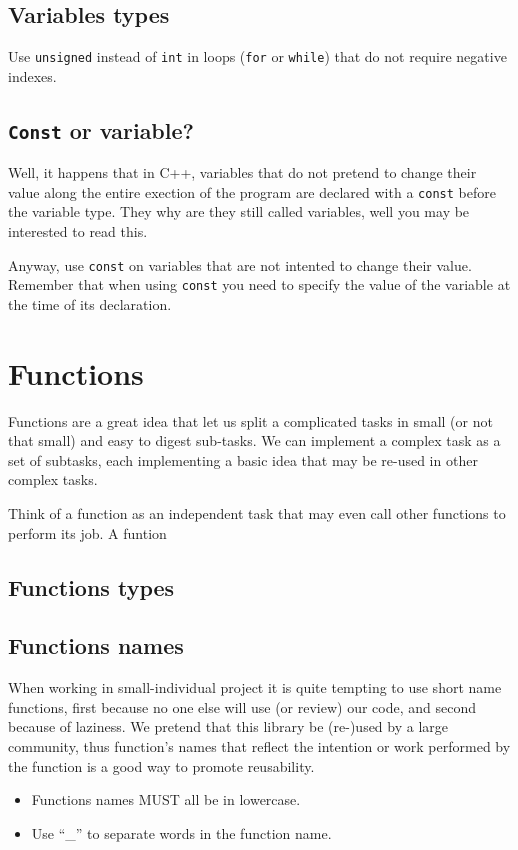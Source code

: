 \documentclass[12pt,a4paper,final]{report} %
\begin{document}
\subsection{Variables types}
Use \texttt{unsigned} instead of \texttt{int} in loops (\texttt{for}
or \texttt{while}) that do not require negative indexes.

\subsection{\texttt{Const} or variable?}
Well, it happens that in C++, variables that do not pretend to change
their value along the entire exection of the program are declared with
a \texttt{const} before the variable type. They why are they still
called variables, well you may be interested to read this.

Anyway, use \texttt{const} on variables that are not intented to
change their value. Remember that when using \texttt{const} you need
to specify the value of the variable at the time of its declaration.

\section{Functions}
Functions are a great idea that let us split a complicated tasks in
small (or not that small) and easy to digest sub-tasks. We can
implement a complex task as a set of subtasks, each implementing a
basic idea that may be re-used in other complex tasks.

Think of a function as an independent task that may even call other
functions to perform its job. A funtion

\subsection{Functions types}

\subsection{Functions names}
When working in small-individual project it is quite tempting to use
short name functions, first because no one else will use (or review)
our code, and second because of laziness. We pretend that this library
be (re-)used by a large community, thus function's names that reflect
the intention or work performed by the function is a good way to
promote reusability.

\begin{itemize}
  \item Functions names MUST all be in lowercase.
  \item Use ``\_'' to separate words in the function name.
\end{itemize}
\end{document}
